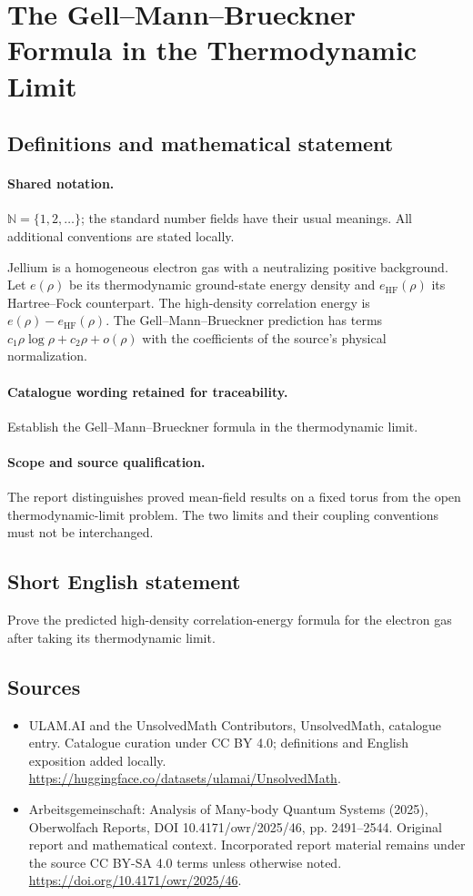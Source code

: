 \documentclass[11pt]{article}
\begin{document}
\section{The Gell–Mann–Brueckner Formula in the Thermodynamic Limit}\label{statement}

\subsection{Definitions and mathematical statement}

\paragraph{Shared notation.}$\mathbb N=\{1,2,\ldots\}$; the standard number fields have their usual meanings. All additional conventions are stated locally.


Jellium is a homogeneous electron gas with a neutralizing positive background. Let $e(\rho)$ be its thermodynamic ground-state energy density and $e_{\mathrm{HF}}(\rho)$ its Hartree--Fock counterpart. The high-density correlation energy is $e(\rho)-e_{\mathrm{HF}}(\rho)$. The Gell--Mann--Brueckner prediction has terms $c_1\rho\log\rho+c_2\rho+o(\rho)$ with the coefficients of the source's physical normalization.

\paragraph{Catalogue wording retained for traceability.}
Establish the Gell–Mann–Brueckner formula in the thermodynamic limit.

\paragraph{Scope and source qualification.}The report distinguishes proved mean-field results on a fixed torus from the open thermodynamic-limit problem. The two limits and their coupling conventions must not be interchanged.
\subsection{Short English statement}
Prove the predicted high-density correlation-energy formula for the electron gas after taking its thermodynamic limit.
\subsection{Sources}
\begin{itemize}
\item[\hypertarget{source:statement:1}{S1}] ULAM.AI and the UnsolvedMath Contributors, UnsolvedMath, catalogue entry. Catalogue curation under CC BY 4.0; definitions and English exposition added locally.
\url{https://huggingface.co/datasets/ulamai/UnsolvedMath}.
\item[\hypertarget{source:statement:2}{S2}] Arbeitsgemeinschaft: Analysis of Many-body Quantum Systems (2025), Oberwolfach Reports, DOI 10.4171/owr/2025/46, pp. 2491--2544. Original report and mathematical context. Incorporated report material remains under the source CC BY-SA 4.0 terms unless otherwise noted.
\url{https://doi.org/10.4171/owr/2025/46}.
\end{itemize}
\label{end:statement}
\end{document}
